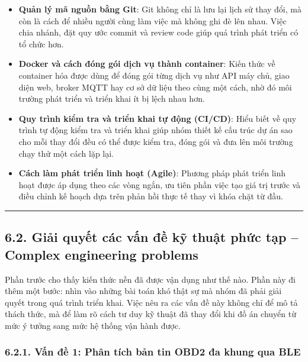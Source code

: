 \documentclass[a4paper]{extarticle}
\providecommand{\tightlist}{%
  \setlength{\itemsep}{0pt}\setlength{\parskip}{0pt}}
\begin{document}
\begin{itemize}
\tightlist
\item
  \textbf{Quản lý mã nguồn bằng Git}: Git không chỉ là lưu
  lại lịch sử thay đổi, mà còn là cách để nhiều người cùng làm việc mà
  không ghi đè lên nhau. Việc chia nhánh, đặt quy ước commit và review
  code giúp quá trình phát triển có tổ chức hơn.
\item
  \textbf{Docker và cách đóng gói dịch vụ thành container}: Kiến thức về
  container hóa được dùng để đóng gói từng dịch vụ như API máy chủ,
  giao diện web, broker MQTT hay cơ sở
  dữ liệu theo cùng một cách, nhờ đó môi trường phát triển và triển khai
  ít bị lệch nhau hơn.
\item
  \textbf{Quy trình kiểm tra và triển khai tự động (CI/CD)}: Hiểu biết về quy trình tự động kiểm tra và
  triển khai giúp nhóm thiết kế cấu trúc dự án sao cho mỗi thay đổi đều
  có thể được kiểm tra, đóng gói và đưa lên môi trường chạy thử một cách
  lặp lại.
\item
  \textbf{Cách làm phát triển linh hoạt (Agile)}: Phương pháp phát triển linh hoạt được áp
  dụng theo các vòng ngắn, ưu tiên phần việc tạo giá trị trước và điều
  chỉnh kế hoạch dựa trên phản hồi thực tế thay vì khóa chặt từ đầu.
\end{itemize}

\begin{center}\rule{0.5\linewidth}{0.5pt}\end{center}

\subsection{6.2. Giải quyết các vấn đề kỹ thuật phức tạp -- Complex engineering problems}\label{62-giux1ea3i-quyux1ebft-cuxe1c-vux1ea5n-ux111ux1ec1-kux1ef9-thuux1eadt-phux1ee9c-tux1ea1p--complex-engineering-problems}

Phần trước cho thấy kiến thức nền đã được vận dụng như thế nào. Phần này
đi thêm một bước: nhìn vào những bài toán khó thật sự mà nhóm đã phải
giải quyết trong quá trình triển khai. Việc nêu ra các vấn đề này không
chỉ để mô tả thách thức, mà để làm rõ cách tư duy kỹ thuật đã thay đổi
khi đồ án chuyển từ mức ý tưởng sang mức hệ thống vận hành được.

\subsubsection{6.2.1. Vấn đề 1: Phân tích bản tin OBD2 đa khung qua
BLE}\label{621-vux1ea5n-ux111ux1ec1-1-phuxe2n-tuxedch-bux1ea3n-tin-obd2-ux111a-khung-qua-ble}
\end{document}
